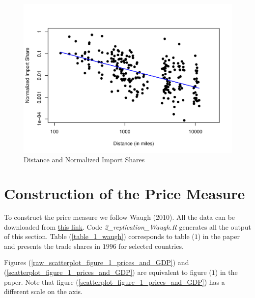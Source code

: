 \documentclass[a4paper,12pt]{article}
\begin{document}
  \begin{figure}[htbp!]
     \centering
     \includegraphics[scale=0.75]{distance_and_normalized_import_share_EK_fig_1.pdf}
     \caption{Distance and Normalized Import Shares}
     \label{EKfig1_distance_norm_import_share}
 \end{figure}
 
 \section{Construction of the Price Measure}
 
 To construct the price measure we follow Waugh (2010). All the data can be downloaded from \href{https://www.openicpsr.org/openicpsr/project/112382/version/V1/view?path=/openicpsr/112382/fcr:versions/V1/data_code_AER_20070560/Data&type=folder}{this link}. Code \textit{2\_replication\_Waugh.R} generates all the output of this section. Table (\ref{table_1_waugh}) corresponds to table ($1$) in the paper and presents the trade shares in $1996$ for selected countries. 
 
 
 
 Figures (\ref{raw_scatterplot_figure_1_prices_and_GDP}) and (\ref{scatterplot_figure_1_prices_and_GDP}) are equivalent to figure ($1$) in the paper. Note that figure (\ref{scatterplot_figure_1_prices_and_GDP}) has a different scale on the axis. 
 
\end{document}
